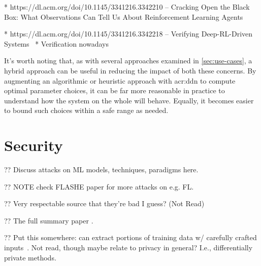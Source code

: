 * https://dl.acm.org/doi/10.1145/3341216.3342210 -- Cracking Open the Black Box: What Observations Can Tell Us About Reinforcement Learning Agents~\parencite{DBLP:conf/sigcomm/DethiseCK19}

* https://dl.acm.org/doi/10.1145/3341216.3342218 -- Verifying Deep-RL-Driven Systems~\parencite{DBLP:conf/sigcomm/KazakBKS19}
* Verification nowadays~\parencite{DBLP:conf/sigcomm/EliyahuKKS21,drl-verification-2}

It's worth noting that, as with several approaches examined in \cref{sec:use-cases}, a hybrid approach can be useful in reducing the impact of both these concerns.
By augmenting an algorithmic or heuristic approach with \gls{acr:ddn} to compute optimal parameter choices, it can be far more reasonable in practice to understand how the system on the whole will behave.
Equally, it becomes easier to bound such choices within a safe range as needed.

%
%
%

\section{Security}\label{sec:ddn-security}

?? Discuss attacks on ML models, techniques, paradigms here.

?? NOTE check FLASHE paper for more attacks on e.g. FL.

?? Very respectable source \cite{DBLP:conf/eurosp/PapernotMJFCS16} that they're bad I guess? (Not Read)

?? The full summary paper \cite{DBLP:conf/eurosp/PapernotMSW18}.

?? Put this somewhere: can extract portions of training data w/ carefully crafted inputs~\parencite{DBLP:journals/corr/abs-2012-07805}. Not read, though maybe relate to privacy in general? I.e., differentially private methods.

